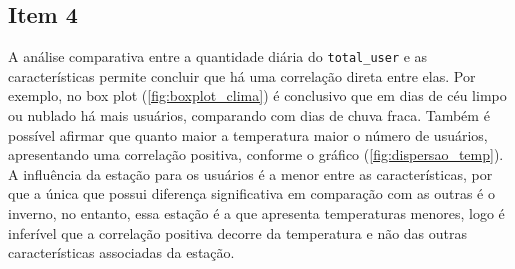 \documentclass[a4paper, 12pt, titlepage]{article}
\begin{document}
\subsection*{Item 4}
A análise comparativa entre a quantidade diária do \texttt{total\_user} e as características permite concluir que há uma correlação direta entre elas. Por exemplo, no box plot (\ref{fig:boxplot_clima}) é conclusivo que em dias de céu limpo ou nublado há mais usuários, comparando com dias de chuva fraca. Também é possível afirmar que quanto maior a temperatura maior o número de usuários, apresentando uma correlação positiva, conforme o gráfico (\ref{fig:dispersao_temp}). A influência da estação para os usuários é a menor entre as características, por que a única que possui diferença significativa em comparação com as outras é o inverno, no entanto, essa estação é a que apresenta temperaturas menores, logo é inferível que a correlação positiva decorre da temperatura e não das outras características associadas da estação.
\end{document}
